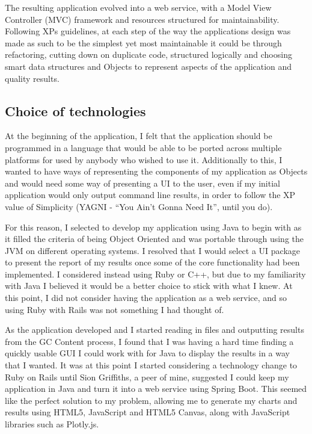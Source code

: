 The resulting application evolved into a web service, with a Model View Controller (MVC) framework and resources structured for maintainability. Following XPs guidelines, at each step of the way the applications design was made as such to be the simplest yet most maintainable it could be through refactoring, cutting down on duplicate code, structured logically and choosing smart data structures and Objects to represent aspects of the application and quality results.

\subsection{Choice of technologies}
At the beginning of the application, I felt that the application should be programmed in a language that would be able to be ported across multiple platforms for used by anybody who wished to use it. Additionally to this, I wanted to have ways of representing the components of my application as Objects and would need some way of presenting a UI to the user, even if my initial application would only output command line results, in order to follow the XP value of Simplicity (YAGNI - ``You Ain't Gonna Need It'', until you do).

For this reason, I selected to develop my application using Java to begin with as it filled the criteria of being Object Oriented and was portable through using the JVM on different operating systems. I resolved that I would select a UI package to present the report of my results once some of the core functionality had been implemented. I considered instead using Ruby or C++, but due to my familiarity with Java I believed it would be a better choice to stick with what I knew. At this point, I did not consider having the application as a web service, and so using Ruby with Rails was not something I had thought of.

As the application developed and I started reading in files and outputting results from the GC Content process, I found that I was having a hard time finding a quickly usable GUI I could work with for Java to display the results in a way that I wanted. It was at this point I started considering a technology change to Ruby on Rails until Sion Griffiths, a peer of mine, suggested I could keep my application in Java and turn it into a web service using Spring Boot\cite{springboot}. This seemed like the perfect solution to my problem, allowing me to generate my charts and results using HTML5, JavaScript and HTML5 Canvas, along with JavaScript libraries such as Plotly.js.

